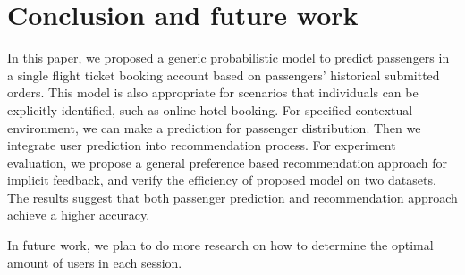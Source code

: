 \documentclass{sig-alternate-05-2015}
\begin{document}
\section{Conclusion and future work}
In this paper, we proposed a generic probabilistic model to predict passengers in a single flight ticket booking account based on passengers' historical submitted orders. This model is also appropriate for scenarios that individuals can be explicitly identified, such as online hotel booking. For specified contextual environment, we can make a prediction for passenger distribution. Then we integrate user prediction into recommendation process. For experiment evaluation, we propose a general preference based recommendation approach for implicit feedback, and verify the efficiency of proposed model on two datasets. The results suggest that both passenger prediction and recommendation approach achieve a higher accuracy. \par
In future work, we plan to do more research on how to determine the optimal amount of users in each session. 

%

%
\end{document}
